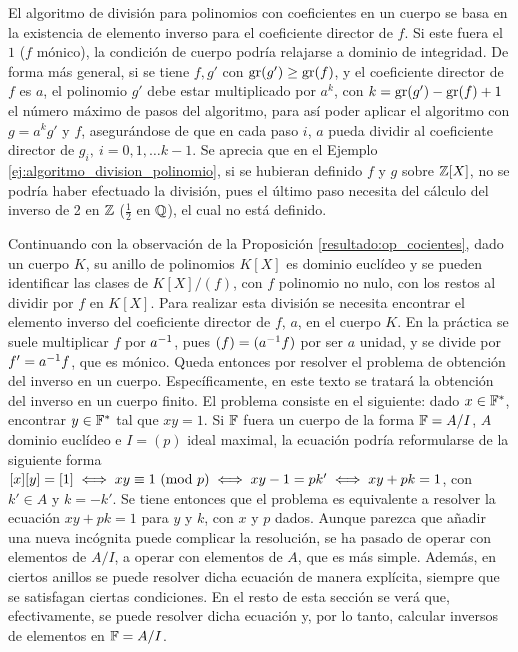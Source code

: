 \begin{obss} \label{resultado:inv_cuerpos}
    \item El algoritmo de división para polinomios con coeficientes en un cuerpo se basa en la existencia de elemento inverso para el coeficiente director de $f$. Si este fuera el $1$ ($f$ mónico), la condición de cuerpo podría relajarse a dominio de integridad. De forma más general, si se tiene $f,g'$ con $\text{gr}(g') \geq \text{gr}(f)$, y el coeficiente director de $f$ es $a$, el polinomio $g'$ debe estar multiplicado por $a^k$, con $k = \text{gr}(g') -\text{gr}(f) + 1$ el número máximo de pasos del algoritmo, para así poder aplicar el algoritmo con $g = a^kg'$ y $f$, asegurándose de que en cada paso $i$, $a$ pueda dividir al coeficiente director de $g_i, \ i = 0,1,\ldots k-1$. Se aprecia que en el Ejemplo \ref{ej:algoritmo_division_polinomio}, si se hubieran definido $f$ y $g$ sobre $\mathbb{Z}[X]$, no se podría haber efectuado la división, pues el último paso necesita del cálculo del inverso de 2 en $\mathbb{Z}$ ($\frac{1}{2}$ en $\mathbb{Q}$), el cual no está definido.
        
    \item Continuando con la observación de la Proposición \ref{resultado:op_cocientes}, dado un cuerpo $K$, su anillo de polinomios $K[X]$ es dominio euclídeo y se pueden identificar las clases de $K[X]/(f)$, con $f$ polinomio no nulo, con los restos al dividir por $f$ en $K[X]$. Para realizar esta división se necesita encontrar el elemento inverso del coeficiente director de $f$, $a$, en el cuerpo $K$. En la práctica se suele multiplicar $f$ por $a^{-1}$, pues $(f) = (a^{-1}f)$ por ser $a$ unidad, y se divide por $f' = a^{-1}f $, que es mónico. Queda entonces por resolver el problema de obtención del inverso en un cuerpo. Específicamente, en este texto se tratará la obtención del inverso en un cuerpo finito. El problema consiste en el siguiente: dado $x\in \mathbb{F}^*$, encontrar $y\in \mathbb{F}^*$ tal que $xy = 1$. Si $\mathbb{F}$ fuera un cuerpo de la forma $\mathbb{F} = A/I$, $A$ dominio euclídeo e $I = (p)$ ideal maximal, la ecuación podría reformularse de la siguiente forma $[x][y] = [1]\iff xy \equiv 1 \text{ (mod }p)\iff xy - 1 = pk' \iff xy + pk = 1$, con $k'\in A$ y $k = -k'$. Se tiene entonces que el problema es equivalente a resolver la ecuación $xy + pk = 1$ para $y$ y $k$, con $x$ y $p$ dados. Aunque parezca que añadir una nueva incógnita puede complicar la resolución, se ha pasado de operar con elementos de $A/I$, a operar con elementos de $A$, que es más simple. Además, en ciertos anillos se puede resolver dicha ecuación de manera explícita, siempre que se satisfagan ciertas condiciones. En el resto de esta sección se verá que, efectivamente, se puede resolver dicha ecuación y, por lo tanto, calcular inversos de elementos en $\mathbb{F} = A/I$.


\end{obss}
